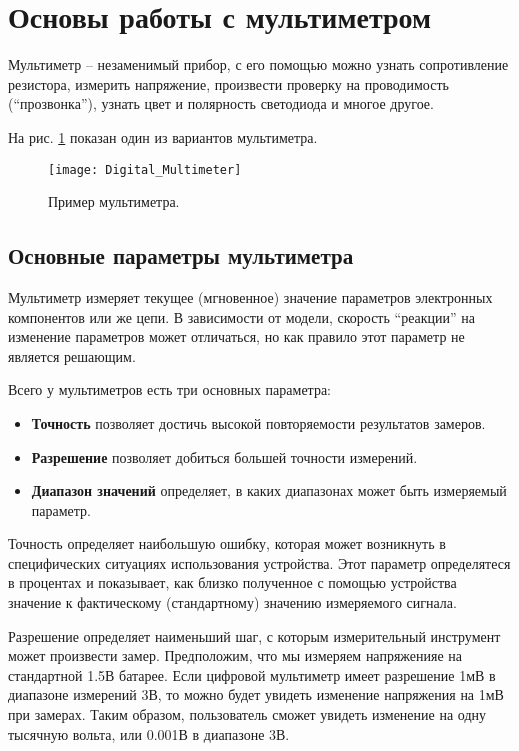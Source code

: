 \documentclass[../main.tex]{subfiles}
\begin{document}
\section{Основы работы с мультиметром}

Мультиметр -- незаменимый прибор, с его помощью можно узнать сопротивление
резистора, измерить напряжение, произвести проверку на проводимость
(``прозвонка''), узнать цвет и полярность светодиода и многое другое.

На рис. \ref{fig:multimeter-example} показан один из вариантов мультиметра.

\begin{figure}[ht]
  \centering
  \texttt{[image: Digital\_Multimeter]}
  \caption{Пример мультиметра.}
  \label{fig:multimeter-example}
\end{figure}

\subsection{Основные параметры мультиметра}

Мультиметр измеряет текущее (мгновенное) значение параметров электронных
компонентов или же цепи.  В зависимости от модели, скорость ``реакции'' на
изменение параметров может отличаться, но как правило этот параметр не является
решающим.

Всего у мультиметров есть три\cite{fluke:multimeter} основных параметра:
\begin{itemize}
\item \textbf{Точность} позволяет достичь высокой повторяемости результатов
  замеров.
\item \textbf{Разрешение} позволяет добиться большей точности измерений.
\item \textbf{Диапазон значений} определяет, в каких диапазонах может быть
  измеряемый параметр.
\end{itemize}

Точность определяет наибольшую ошибку, которая может возникнуть в специфических
ситуациях использования устройства.  Этот параметр определятеся в процентах и
показывает, как близко полученное с помощью устройства значение к фактическому
(стандартному) значению измеряемого сигнала.

Разрешение определяет наименьший шаг, с которым измерительный инструмент может
произвести замер.  Предположим, что мы измеряем напряженияе на стандартной 1.5В
батарее.  Если цифровой мультиметр имеет разрешение 1мВ в диапазоне измерений
3В, то можно будет увидеть изменение напряжения на 1мВ при замерах.  Таким
образом, пользователь сможет увидеть изменение на одну тысячную вольта, или
0.001В в диапазоне 3В.
\end{document}
